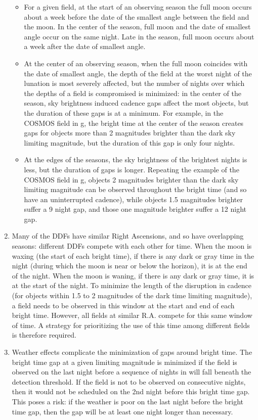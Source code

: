 \documentclass[DM,authoryear,toc]{lsstdoc}
\begin{document}
\begin{enumerate}
\begin{itemize}
\item For a given field, at the start of an observing season the full moon occurs about a week before the date of the smallest angle between the field and the moon.
  In the center of the season, full moon and the date of smallest angle occur on the same night. Late in the season, full moon occurs about a week after the date of smallest angle.
\item At the center of an observing season, when the full moon coincides with the date of smallest angle, the depth of the field at the worst night of the lunation is most severely affected, but the number of nights over which the depths of a field is compromised is minimized: in the center of the season, sky brightness induced cadence gaps affect the most objects, but the duration of these gaps is at a minimum.
  For example, in the COSMOS field in g, the bright time at the center of the season creates gaps for objects more than 2 magnitudes brighter than the dark sky limiting magnitude, but the duration of this gap is only four nights.
\item At the edges of the seasons, the sky brightness of the brightest nights is less, but the duration of gaps is longer.
  Repeating the example of the COSMOS field in g, objects 2 magnitudes brighter than the dark sky limiting magnitude can be observed throughout the bright time (and so have an uninterrupted cadence), while objects 1.5 magnitudes brighter suffer a 9 night gap, and those one magnitude brighter suffer a 12 night gap.
\end{itemize}
\item Many of the DDFs have similar Right Ascensions, and so have overlapping seasons: different DDFs compete with each other for time. When the moon is waxing (the start of each bright time), if there is any dark or gray time in the night (during which the moon is near or below the horizon), it is at the end of the night.
  When the moon is waning, if there is any dark or gray time, it is at the start of the night. To minimize the length of the disruption in cadence (for objects within 1.5 to 2 magnitudes of the dark time limiting magnitude), a field needs to be observed in this window at the start and end of each bright time.
  However, all fields at similar R.A. compete for this same window of time. A strategy for prioritizing the use of this time among different fields is therefore required.
\item Weather effects complicate the minimization of gaps around bright time.
  The bright time gap at a given limiting magnitude is minimized if the field is observed on the last night before a sequence of nights in will fall beneath the detection threshold.
  If the field is not to be observed on consecutive nights, then it would not be scheduled on the 2nd night before this bright time gap.
  This poses a risk: if the weather is poor on the last night before the bright time gap, then the gap will be at least one night longer than necessary.
\end{enumerate}
\end{document}
